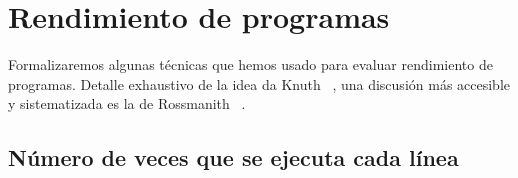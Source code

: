 

\chapter{Rendimiento de programas}
\label{apx:rendimiento-programas}

  Formalizaremos algunas técnicas que hemos usado
  para evaluar rendimiento de programas.
  Detalle exhaustivo de la idea da Knuth~%
    \cite{knuth97:_fundam_algor},
  una discusión más accesible y sistematizada es la de Rossmanith~%
    \cite{rossmanith12:_analysis_algorithms}.

\section{Número de veces que se ejecuta cada línea}
\label{sec:ejecucion-lineas}

